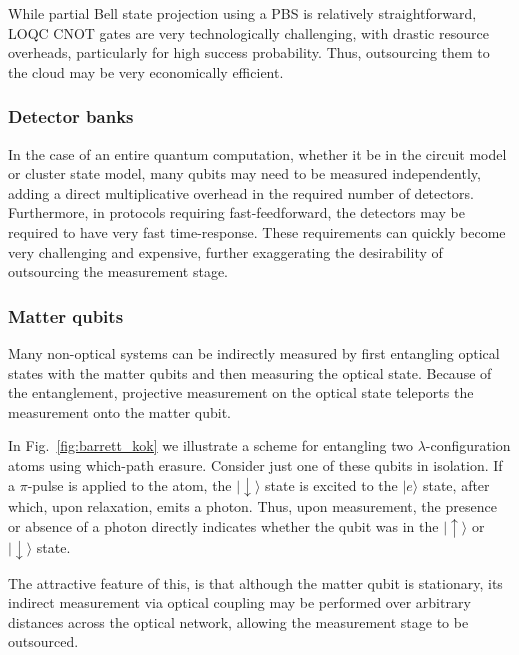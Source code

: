\documentclass[aps,rmp,twocolumn,amsmath,amssymb,nofootinbib,superscriptaddress,longbibliography,floatfix]{revtex4-1}
\newcommand{\ket}[1]{|#1\rangle}
\begin{document}
While partial Bell state projection using a PBS is relatively straightforward, LOQC CNOT gates are very technologically challenging, with drastic resource overheads, particularly for high success probability. Thus, outsourcing them to the cloud may be very economically efficient.

%
%

\subsubsection{Detector banks}

In the case of an entire quantum computation, whether it be in the circuit model or cluster state model, many qubits may need to be measured independently, adding a direct multiplicative overhead in the required number of detectors. Furthermore, in protocols requiring fast-feedforward, the detectors may be required to have very fast time-response. These requirements can quickly become very challenging and expensive, further exaggerating the desirability of outsourcing the measurement stage.

%
%

\subsubsection{Matter qubits}

Many non-optical systems can be indirectly measured by first entangling optical states with the matter qubits and then measuring the optical state. Because of the entanglement, projective measurement on the optical state teleports the measurement onto the matter qubit.

In Fig.~\ref{fig:barrett_kok} we illustrate a scheme for entangling two $\lambda$-configuration atoms using which-path erasure. Consider just one of these qubits in isolation. If a $\pi$-pulse is applied to the atom, the $\ket{\downarrow}$ state is excited to the $\ket{e}$ state, after which, upon relaxation, emits a photon. Thus, upon measurement, the presence or absence of a photon directly indicates whether the qubit was in the $\ket\uparrow$ or $\ket\downarrow$ state.

The attractive feature of this, is that although the matter qubit is stationary, its indirect measurement via optical coupling may be performed over arbitrary distances across the optical network, allowing the measurement stage to be outsourced.

%
%
\end{document}
